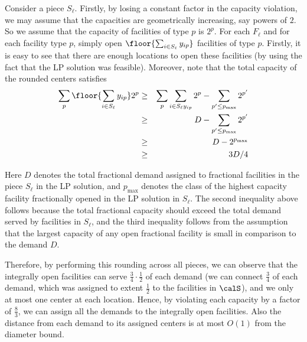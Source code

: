 Consider a piece $S_{\ell}$. Firstly, by losing a constant factor in the capacity violation, we may assume that the capacities are geometrically increasing, say powers of $2$. So we assume that the capacity of facilities of type $p$ is $2^p$. For each $F_\ell$ and for each facility type $p$, simply open $\floor{\sum_{i \in S_\ell} y_{ip}}$ facilities of type $p$. Firstly, it is easy to see that there are enough locations to open these facilities (by using the fact that the LP solution was feasible). Moreover, note that the total capacity of the rounded centers satisfies
\begin{eqnarray}
\nonumber \sum_p \floor{\sum_{i \in S_\ell} y_{ip}} 2^p &\geq& \sum_p \sum_{i \in S_\ell y_{ip}} 2^p - \sum_{p' \leq p_{\max}} 2^{p'}  \\
\nonumber                                               &\geq&  D - \sum_{p' \leq p_{\max}} 2^{p'} \\
\nonumber                                               &\geq& D - 2^{p_{\max}} \\
\nonumber                                               &\geq& 3D/4
\end{eqnarray}

Here $D$ denotes the total fractional demand assigned to fractional facilities in the piece $S_{\ell}$ in the LP solution, and $p_{\max}$ denotes the class of the highest capacity facility fractionally opened in the LP solution in $S_{\ell}$. The second inequality above follows because the total fractional capacity should exceed the total demand served by facilities in $S_{\ell}$, and the third inequality follows from the assumption that the largest capacity of any open fractional facility is small in comparison to the demand $D$.

Therefore, by performing this rounding across all pieces, we can observe that the integrally open facilities can serve $\frac34 \cdot \frac12$ of each demand (we can connect $\frac34$ of each demand, which was assigned to extent $\frac12$ to the facilities in $\calS$), and we only at most one center at each location. Hence, by violating each capacity by a factor of $\frac83$, we can assign all the demands to the integrally open facilities. Also the distance from each demand to its assigned centers is at most $O(1)$ from the diameter bound.

